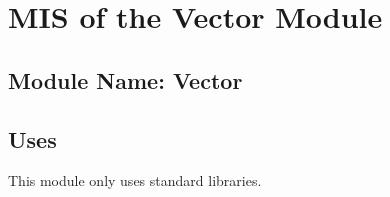 \documentclass[12pt]{article}
\newcommand{\colDescrip}{0.63\textwidth}
\newcommand{\funcPadding}{1.3}
\newcommand{\newfunc}{\\[1.5em]}
\begin{document}
%
%
%	


\section{MIS of the Vector Module} \label{MISVector}

\subsection{Module Name: Vector}

\subsection{Uses} \label{SecUVector}
	This module only uses standard libraries.
\end{document}
